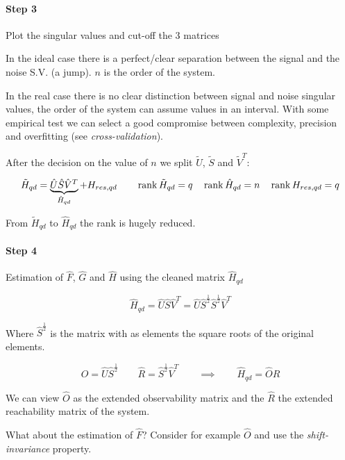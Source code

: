 \paragraph{Step 3} Plot the singular values and cut-off the 3 matrices


In the ideal case there is a perfect/clear separation between the signal and the noise S.V. (a jump). $n$ is the order of the system.


In the real case there is no clear distinction between signal and noise singular values, the order of the system can assume values in an interval.
With some empirical test we can select a good compromise between complexity, precision and overfitting (see \emph{cross-validation}).

After the decision on the value of $n$ we split $\tilde{U}$, $\tilde{S}$ and $\tilde{V}^T$:

\[
    \tilde{H}_{qd} = \underbrace{\hat{U} \hat{S} \hat{V}^T}_{\hat{H}_{qd}} + H_{res,qd} \qquad \operatorname{rank} \tilde{H}_{qd} = q \quad \operatorname{rank} \hat{H}_{qd} = n \quad \operatorname{rank} H_{res,qd} = q
\]

From $\tilde{H}_{qd}$ to $\hat{H}_{qd}$ the rank is hugely reduced.

\paragraph{Step 4} Estimation of $\hat{F}$, $\hat{G}$ and $\hat{H}$ using the cleaned matrix $\hat{H}_{qd}$

\[
    \hat{H}_{qd} = \hat{U} \hat{S} \hat{V}^T = \hat{U} \hat{S}^{\frac{1}{2}} \hat{S}^{\frac{1}{2}} \hat{V}^T
\]

Where $\hat{S}^{\frac{1}{2}}$ is the matrix with as elements the square roots of the original elements.

\[
    \hat{O} = \hat{U} \hat{S}^{\frac{1}{2}} \qquad \hat{R} = \hat{S}^{\frac{1}{2}} \hat{V}^T \qquad \implies \qquad \hat{H}_{qd} = \hat{O} \hat{R}
\]

We can view $\hat{O}$ as the extended observability matrix and the $\hat{R}$ the extended reachability matrix of the system.


What about the estimation of $\hat{F}$? Consider for example $\hat{O}$ and use the \emph{shift-invariance} property.


